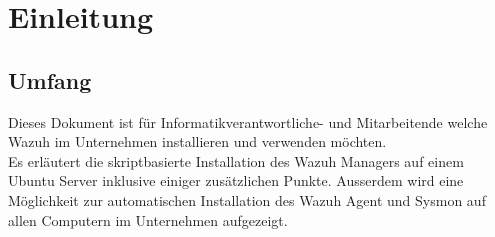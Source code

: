 \chapter{Einleitung}

\section{Umfang}
Dieses Dokument ist für Informatikverantwortliche- und Mitarbeitende welche Wazuh im Unternehmen installieren und verwenden möchten.\\

Es erläutert die skriptbasierte Installation des Wazuh Managers auf einem Ubuntu Server inklusive einiger zusätzlichen Punkte.
Ausserdem wird eine Möglichkeit zur automatischen Installation des Wazuh Agent und Sysmon auf allen Computern im Unternehmen aufgezeigt.
